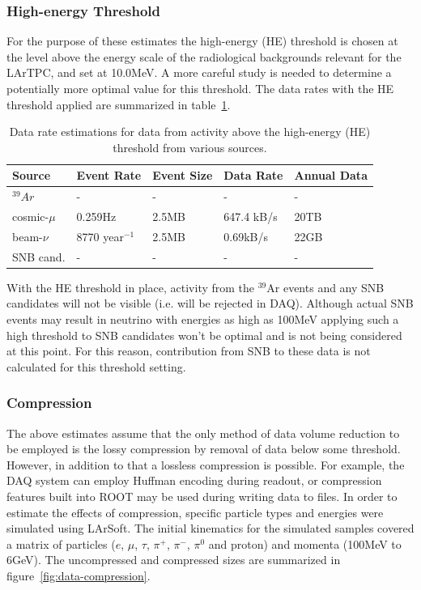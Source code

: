 \subsubsection{High-energy Threshold}

For the purpose of these estimates the  high-energy (HE) threshold is chosen at the level above 
the energy scale of the radiological backgrounds relevant for the LArTPC, and set at  10.0MeV.
A more careful study is needed to determine a potentially more optimal value for this threshold.
The data rates with the HE threshold applied are summarized in table~\ref{tab:he-volume}.

	
\begin{table}[ht!]
\centering
\begin{tabular}{| p{1.25in} | p{0.95in} | p{0.75in} | p{1in} | p{0.75in} |}		\hline	
Source & Event Rate & Event Size & Data Rate & Annual Data \\ \hline
$^{39}Ar$ & - & - & - & -\\	\hline
cosmic-$\mu$ & 0.259Hz & 2.5MB & 647.4 kB/s & 20TB \\ \hline
beam-$\nu$ & 8770 year$^{-1}$ & 2.5MB & 0.69kB/s & 22GB \\
\hline
SNB cand. & - & - & - & -\\ \hline
\end{tabular}
\caption{Data rate estimations for data from activity above the high-energy (HE) threshold from
various sources.}
\label{tab:he-volume}
\end{table}


%

With the HE threshold in place, activity from the $^{39}$Ar events and any SNB
candidates will not be visible (i.e. will be rejected in DAQ). Although actual SNB
events may result in neutrino with energies as high as 100MeV applying such a high
threshold to SNB candidates won't be optimal and is not being considered at this point.
For this reason, contribution from SNB to these data is not calculated for this threshold setting.


\subsubsection{Compression}

The above estimates assume that the only method of data volume reduction to be employed is the
lossy compression by removal of data below some threshold. However, in addition to that
a lossless compression is possible. For example, the DAQ system can employ Huffman encoding during readout, or compression features built into ROOT may be used during writing data to files. In order to estimate
the effects of compression, specific particle types and energies were simulated using LArSoft.
The initial kinematics for the simulated samples covered a matrix of
particles ($e$, $\mu$, $\tau$, $\pi^+$, $\pi^-$, $\pi^0$ and proton) and momenta
(100MeV to 6GeV).
The uncompressed and compressed sizes are summarized in figure~\ref{fig:data-compression}.

